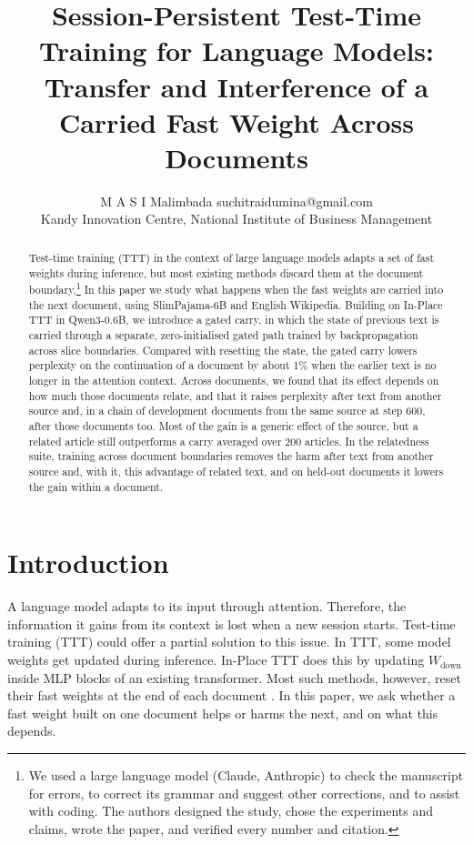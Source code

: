\documentclass[10pt]{article} %
\title{Session-Persistent Test-Time Training for Language Models: Transfer and Interference of a Carried Fast Weight Across Documents}
\author{\name M A S I Malimbada \email suchitraidumina@gmail.com \\
      \addr Kandy Innovation Centre, National Institute of Business Management}
\begin{document}
\maketitle

\begin{abstract}
Test-time training (TTT) in the context of large language models adapts a set of fast weights during inference, but most existing methods discard them at the document boundary.\footnote{We used a large language model (Claude, Anthropic) to check the manuscript for errors, to correct its grammar and suggest other corrections, and to assist with coding. The authors designed the study, chose the experiments and claims, wrote the paper, and verified every number and citation.} In this paper we study what happens when the fast weights are carried into the next document, using SlimPajama-6B and English Wikipedia. Building on In-Place TTT in Qwen3-0.6B, we introduce a gated carry, in which the state of previous text is carried through a separate, zero-initialised gated path trained by backpropagation across slice boundaries. Compared with resetting the state, the gated carry lowers perplexity on the continuation of a document by about 1\% when the earlier text is no longer in the attention context. Across documents, we found that its effect depends on how much those documents relate, and that it raises perplexity after text from another source and, in a chain of development documents from the same source at step 600, after those documents too. Most of the gain is a generic effect of the source, but a related article still outperforms a carry averaged over 200 articles. In the relatedness suite, training across document boundaries removes the harm after text from another source and, with it, this advantage of related text, and on held-out documents it lowers the gain within a document.
\end{abstract}

\section{Introduction}

A language model adapts to its input through attention. Therefore, the information it gains from its context is lost when a new session starts. Test-time training (TTT) could offer a partial solution to this issue. In TTT, some model weights get updated during inference. In-Place TTT \citep{feng2026inplace} does this by updating $W_{\mathrm{down}}$ inside MLP blocks of an existing transformer. Most such methods, however, reset their fast weights at the end of each document \citep{sun2025learning,tandon2025endtoend,feng2026inplace}. In this paper, we ask whether a fast weight built on one document helps or harms the next, and on what this depends.
\end{document}
